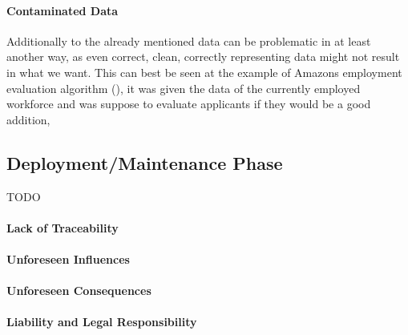 \paragraph{Contaminated Data}
Additionally to the already mentioned data can be problematic 
in at least another way, as even correct, clean, correctly representing data might not result in what we want.
This can best be seen at the example of Amazons employment evaluation algorithm (\cite{Higginbottom2018}), it was given the data of the currently employed workforce and was suppose to evaluate applicants if they would be a good addition, 


\subsection{Deployment/Maintenance Phase}
{\color{red} TODO}

\paragraph{Lack of Traceability}


\paragraph{Unforeseen Influences}


\paragraph{Unforeseen Consequences}


\paragraph{Liability and Legal Responsibility}

